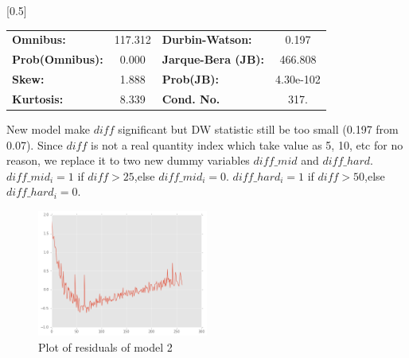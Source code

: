 \documentclass{beamer}
\begin{document}
\begin{frame}
\begin{center}
{\begin{tabular}{lccccc}
\end{tabular}
}
\scalebox{0.5}[0.5]{
\begin{tabular}{lclc}
\toprule
\textbf{Omnibus:}       & 117.312 & \textbf{  Durbin-Watson:     } &     0.197  \\
\textbf{Prob(Omnibus):} &   0.000 & \textbf{  Jarque-Bera (JB):  } &   466.808  \\
\textbf{Skew:}          &   1.888 & \textbf{  Prob(JB):          } & 4.30e-102  \\
\textbf{Kurtosis:}      &   8.339 & \textbf{  Cond. No.          } &      317.  \\
\bottomrule
\end{tabular}
}
\end{center}

\end{frame}

\begin{frame}

New model make $diff$ significant but DW statistic still be too small (0.197 from 0.07). 
Since $diff$ is not a real quantity index which take value as 5, 10, etc for no reason,
we replace it to two new dummy variables $diff\_mid$ and $diff\_hard$. 
$diff\_mid_i=1$ if $diff > 25$,else $diff\_mid_i=0$.
$diff\_hard_i=1$ if $diff > 50$,else $diff\_hard_i=0$.


\begin{figure}[h]
\includegraphics[width=0.5\textwidth, inner]{model2-resid.png}
\caption{Plot of residuals of model 2}
\label{fig:f4}
\end{figure}

\end{frame}
\end{document}
